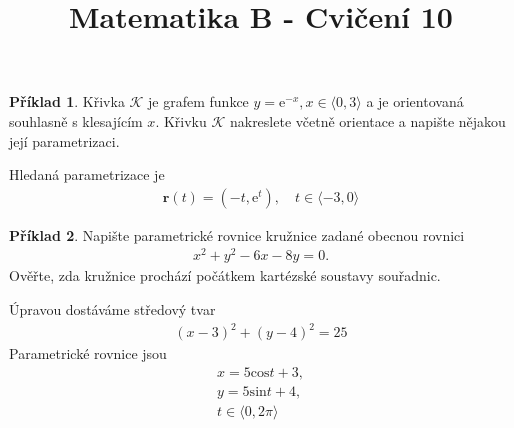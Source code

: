 \documentclass{article}
\title{Matematika B - Cvičení 10}
\date{}
\theoremstyle{definition}
\newtheorem{exmp}{Příklad}[section]
\newcommand{\e}[1]{\mathrm{e}^{#1}}
\newcommand{\vect}[1]{\bm{#1}}
\newenvironment{colbox}[1]
  {\newcommand\colboxcolor{#1}%
   \begin{lrbox}{\selvestebox}%
   \begin{minipage}{\dimexpr\columnwidth-2\fboxsep\relax}}
  {\end{minipage}\end{lrbox}%
   \begin{center}
   \colorbox[HTML]{\colboxcolor}{\usebox{\selvestebox}}
   \end{center}}
\begin{document}
\maketitle


\begin{colbox}{DDDDDD}
\begin{exmp}
    Křivka $\mathcal{K}$ je grafem funkce $y=\e{-x}, x\in \langle 0, 3\rangle$ a je orientovaná souhlasně s klesajícím $x$. Křivku $\mathcal{K}$ nakreslete včetně orientace a napište nějakou její parametrizaci.
\end{exmp}
\end{colbox}

Hledaná parametrizace je
\begin{align*}
    \vect{r}(t) = (-t, \e{t}),\quad t\in \langle -3, 0\rangle 
\end{align*}

\begin{colbox}{DDDDDD}
\begin{exmp}
    Napište parametrické rovnice kružnice zadané obecnou rovnici 
    \begin{align*}
        x^2 + y^2 -6x - 8y = 0.
    \end{align*}
    Ověřte, zda kružnice prochází počátkem kartézské soustavy souřadnic.
\end{exmp}
\end{colbox}

Úpravou dostáváme středový tvar
\begin{align*}
    (x-3)^2 + (y-4)^2=25
\end{align*}
Parametrické rovnice jsou 
\begin{align*}
    x=5\text{cos}t + 3,\\
    y=5\text{sin}t + 4,\\
    t\in \langle 0, 2\pi\rangle
\end{align*}
\end{document}
